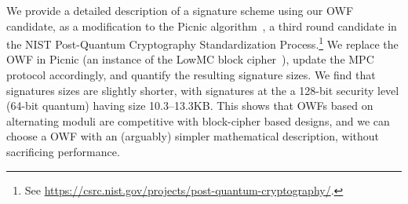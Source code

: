 We provide a detailed description of a signature scheme using our OWF candidate,
as a modification to the Picnic
algorithm~\cite{CCS:CDGORR17,CCS:KatKolWan18,TCHES:KalZav20,picnic-spec}, a
third round candidate in the NIST Post-Quantum Cryptography Standardization
Process.\footnote{See
\url{https://csrc.nist.gov/projects/post-quantum-cryptography/}.} We replace
the OWF in Picnic (an instance of the LowMC block cipher~\cite{EC:ARSTZ15}),
update the MPC protocol accordingly, and quantify the resulting signature
sizes.  We find that signatures sizes are slightly shorter, with signatures at
the a 128-bit security level (64-bit quantum) having size 10.3--13.3KB.  This
shows that OWFs based on alternating moduli are competitive with block-cipher
based designs, and we can choose a OWF with an (arguably) simpler mathematical
description, without sacrificing performance. 

\newpage
